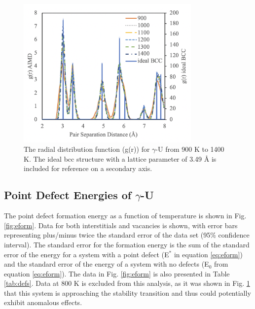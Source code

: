 \documentclass[review]{elsarticle}
\begin{document}
\begin{figure}[h]
 \centering
 \includegraphics[width=0.8\textwidth]{4_rdf.png} 
 \caption{The radial distribution function (g(r)) for $\gamma$-U from 900 K to 1400 K. The ideal bcc structure with a lattice parameter of 3.49 {\AA} is included for reference on a secondary axis.  }
 \label{fig:rdf}
\end{figure}

\FloatBarrier

\subsection{Point Defect Energies of $\gamma$-U}

The point defect formation energy as a function of temperature is shown in Fig. \ref{fig:eform}. Data for both interstitials and vacancies is shown, with error bars representing plus/minus twice the standard error of the data set (95\% confidence interval). The standard error for the formation energy is the sum of the standard error of the energy for a system with a point defect (E$^*$ in equation \ref{eq:eform}) and the standard error of the energy of a system with no defects (E$_0$ from equation \ref{eq:eform}). The data in Fig. \ref{fig:eform} is also presented in Table \ref{tab:defs}. Data at 800 K is excluded from this analysis, as it was shown in Fig. \ref{fig:rdf} that this system is approaching the stability transition and thus could potentially exhibit anomalous effects. 
\end{document}
